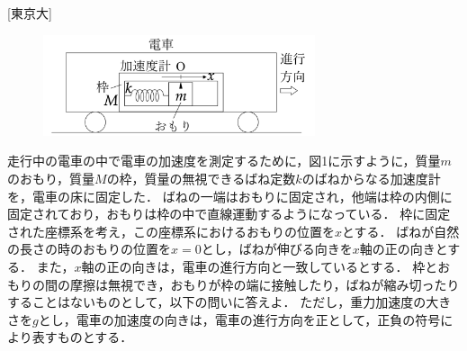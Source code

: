 

\noindent
{} [東京大]

\begin{figure}
    \includegraphics[width=8cm]{fig/fig_1_7_1.pdf}
    \caption{}
\end{figure}
走行中の電車の中で電車の加速度を測定するために，図1に示すように，質量$m$のおもり，質量$M$の枠，質量の無視できるばね定数$k$のばねからなる加速度計を，電車の床に固定した．
ばねの一端はおもりに固定され，他端は枠の内側に固定されており，おもりは枠の中で直線運動するようになっている．
枠に固定された座標系を考え，この座標系におけるおもりの位置を$x$とする．
ばねが自然の長さの時のおもりの位置を$x = 0$とし，ばねが伸びる向きを$x$軸の正の向きとする．
また，$x$軸の正の向きは，電車の進行方向と一致しているとする．
枠とおもりの間の摩擦は無視でき，おもりが枠の端に接触したり，ばねが縮み切ったりすることはないものとして，以下の問いに答えよ．
ただし，重力加速度の大きさを$g$とし，電車の加速度の向きは，電車の進行方向を正として，正負の符号により表すものとする．

